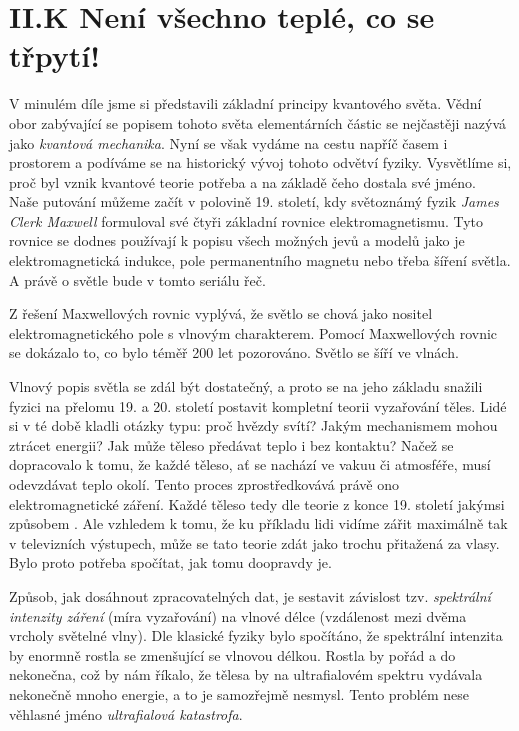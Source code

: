 \documentclass{../../../../style/mkimain}
\begin{document}
\section*{II.K Není všechno teplé, co se třpytí!}
V minulém díle jsme si představili základní principy kvantového světa.
Vědní obor zabývající se popisem tohoto světa elementárních částic se nejčastěji nazývá jako \textit{kvantová mechanika}.
Nyní se však vydáme na cestu napříč časem i prostorem a podíváme se na historický vývoj tohoto odvětví fyziky.
Vysvětlíme si, proč byl vznik kvantové teorie potřeba a na základě čeho dostala své jméno.
\\

Naše putování můžeme začít v polovině 19. století,
kdy světoznámý fyzik \textit{James Clerk Maxwell} formuloval své čtyři základní rovnice elektromagnetismu.
Tyto rovnice se dodnes používají k popisu všech možných jevů a modelů jako je elektromagnetická indukce,
pole permanentního magnetu nebo třeba šíření světla.
A právě o světle bude v tomto seriálu řeč.

Z řešení Maxwellových rovnic vyplývá, že světlo se chová jako nositel elektromagnetického pole s vlnovým charakterem.
Pomocí Maxwellových rovnic se dokázalo to, co bylo téměř 200 let pozorováno. Světlo se šíří ve vlnách.

Vlnový popis světla se zdál být dostatečný,
a proto se na jeho základu snažili fyzici na přelomu 19. a 20. století postavit kompletní teorii vyzařování těles.
Lidé si v té době kladli otázky typu: proč hvězdy svítí?
Jakým mechanismem mohou ztrácet energii? Jak může těleso předávat teplo i bez kontaktu? Načež se dopracovalo k tomu,
že každé těleso, ať se nachází ve vakuu či atmosféře, musí odevzdávat teplo okolí.
Tento proces zprostředkovává právě ono elektromagnetické záření.
Každé těleso tedy dle teorie z konce 19. století jakýmsi způsobem .
Ale vzhledem k tomu, že ku příkladu lidi vidíme zářit maximálně tak v televizních výstupech,
může se tato teorie zdát jako trochu přitažená za vlasy.
Bylo proto potřeba spočítat, jak tomu doopravdy je.

Způsob, jak dosáhnout zpracovatelných dat,
je sestavit závislost tzv. \textit{spektrální intenzity záření} (míra vyzařování) na vlnové délce (vzdálenost mezi dvěma vrcholy světelné vlny).
Dle klasické fyziky bylo spočítáno, že spektrální intenzita by enormně rostla se zmenšující se vlnovou délkou.
Rostla by pořád a do nekonečna, což by nám říkalo, že tělesa by na ultrafialovém spektru vydávala nekonečně mnoho energie,
a to je samozřejmě nesmysl.
Tento problém nese věhlasné jméno \textit{ultrafialová katastrofa}.
\end{document}
